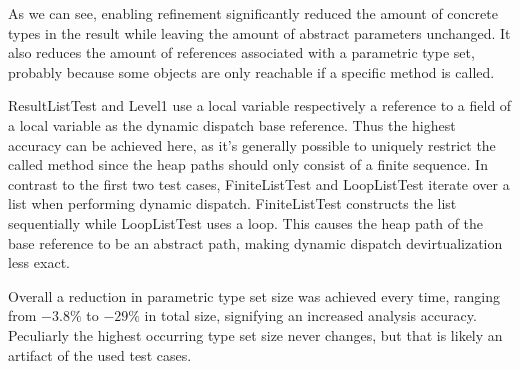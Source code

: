 As we can see, enabling refinement significantly reduced the amount of concrete types in the result while leaving the amount of abstract parameters unchanged. It also reduces the amount of references associated with a parametric type set, probably because some objects are only reachable if a specific method is called.

ResultListTest and Level1 use a local variable respectively a reference to a field of a local variable as the dynamic dispatch base reference. Thus the highest accuracy can be achieved here, as it's generally possible to uniquely restrict the called method since the heap paths should only consist of a finite sequence.
In contrast to the first two test cases, FiniteListTest and LoopListTest iterate over a list when performing dynamic dispatch. FiniteListTest constructs the list sequentially while LoopListTest uses a loop. This causes the heap path of the base reference to be an abstract path, making dynamic dispatch devirtualization less exact.

Overall a reduction in parametric type set size was achieved every time, ranging from $-3.8\%$ to $-29\%$ in total size, signifying an increased analysis accuracy. Peculiarly the highest occurring type set size never changes, but that is likely an artifact of the used test cases. 